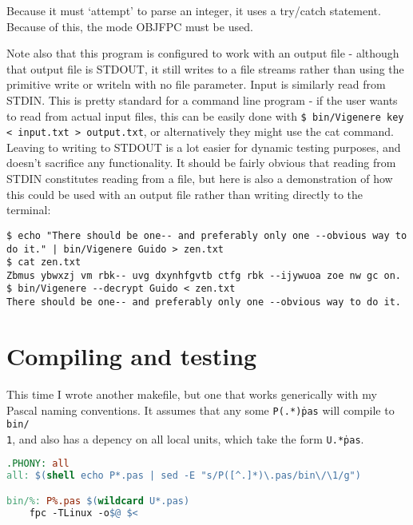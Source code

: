 \documentclass[fleqn,a4paper,11pt]{article}
\begin{document}
    Because it must `attempt' to parse an integer, it uses a try/catch
    statement. Because of this, the mode OBJFPC must be used.

    Note also that this program is configured to work with an output file -
    although that output file is STDOUT, it still writes to a file streams
    rather than using the primitive write or writeln with no file parameter.
    Input is similarly read from STDIN. This is pretty standard for a command
    line program - if the user wants to read from actual input files, this can
    be easily done with \texttt{\$ bin/Vigenere key < input.txt > output.txt},
    or alternatively they might use the cat command. Leaving to writing to
    STDOUT is a lot easier for dynamic testing purposes, and doesn't sacrifice
    any functionality.  It should be fairly obvious that reading from STDIN
    constitutes reading from a file, but here is also a demonstration of how
    this could be used with an output file rather than writing directly to the
    terminal:

\begin{lstlisting}[caption=Use of an output file]
$ echo "There should be one-- and preferably only one --obvious way to do it." | bin/Vigenere Guido > zen.txt
$ cat zen.txt
Zbmus ybwxzj vm rbk-- uvg dxynhfgvtb ctfg rbk --ijywuoa zoe nw gc on.
$ bin/Vigenere --decrypt Guido < zen.txt
There should be one-- and preferably only one --obvious way to do it.
\end{lstlisting}
\iffalse $ \fi %

    \section{Compiling and testing}

    This time I wrote another makefile, but one that works generically with my
    Pascal naming conventions. It assumes that any some \texttt{P(.*)\.pas} will
    compile to \texttt{bin/\\1}, and also has a depency on all local units, which
    take the form \texttt{U.*\.pas}.

\begin{lstlisting}[language=make, caption=The generic FPC makefile]
.PHONY: all
all: $(shell echo P*.pas | sed -E "s/P([^.]*)\.pas/bin\/\1/g")

bin/%: P%.pas $(wildcard U*.pas)
	fpc -TLinux -o$@ $<
\end{lstlisting}
\iffalse $ \fi %
\end{document}
